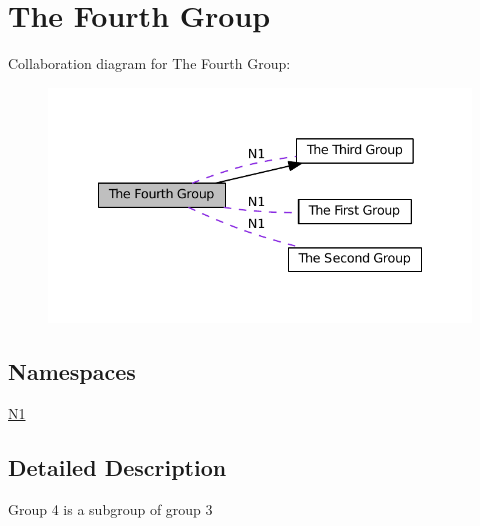 \hypertarget{group__group4}{}\section{The Fourth Group}
\label{group__group4}
Collaboration diagram for The Fourth Group\+:
\nopagebreak
\begin{figure}[H]
\begin{center}
\leavevmode
\includegraphics[width=335pt]{group__group4}
\end{center}
\end{figure}
\subsection*{Namespaces}
\begin{DoxyCompactItemize}
\item 
 \hyperlink{namespaceN1}{N1}
\end{DoxyCompactItemize}


\subsection{Detailed Description}
Group 4 is a subgroup of group 3 